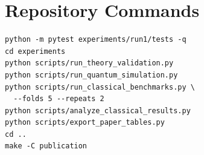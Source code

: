 \documentclass[10pt,twocolumn]{article}
\theoremstyle{definition}
\theoremstyle{remark}
\begin{document}
\begin{table}[t]
\centering
\caption{Mean accuracy for all methods.  Spec-A and Spec-F denote spectral
DECA with amplitude and affine encodings.  HGB denotes histogram gradient
boosting.}
\label{tab:full_accuracy}
\scriptsize
\resizebox{\textwidth}{!}{}
\end{table}

\section{Repository Commands}

{\footnotesize
\begin{verbatim}
python -m pytest experiments/run1/tests -q
cd experiments
python scripts/run_theory_validation.py
python scripts/run_quantum_simulation.py
python scripts/run_classical_benchmarks.py \
  --folds 5 --repeats 2
python scripts/analyze_classical_results.py
python scripts/export_paper_tables.py
cd ..
make -C publication
\end{verbatim}
}



\end{document}
